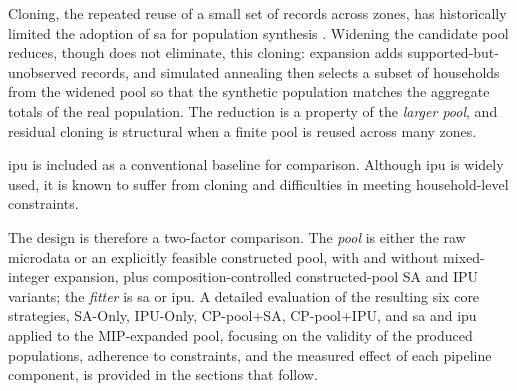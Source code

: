 ﻿\documentclass[../main.tex]{subfiles}
\begin{document}
Cloning, the repeated reuse of a small set of records across zones, has historically limited the adoption of \gls{sa} for population synthesis \citep{Huang2001AMicrodata.}. Widening the candidate pool reduces, though does not eliminate, this cloning: expansion adds supported-but-unobserved records, and simulated annealing then selects a subset of households from the widened pool so that the synthetic population matches the aggregate totals of the real population. The reduction is a property of the \emph{larger pool}, and residual cloning is structural when a finite pool is reused across many zones.

\gls{ipu} is included as a conventional baseline for comparison. Although \gls{ipu} is widely used, it is known to suffer from cloning and difficulties in meeting household-level constraints.

The design is therefore a two-factor comparison. The \emph{pool} is either the raw microdata or an explicitly feasible constructed pool, with and without mixed-integer expansion, plus composition-controlled constructed-pool SA and IPU variants; the \emph{fitter} is \gls{sa} or \gls{ipu}. A detailed evaluation of the resulting six core strategies, SA-Only, IPU-Only, CP-pool+SA, CP-pool+IPU, and \gls{sa} and \gls{ipu} applied to the MIP-expanded pool, focusing on the validity of the produced populations, adherence to constraints, and the measured effect of each pipeline component, is provided in the sections that follow.

\ifstandalone
    
    
\fi
\end{document}
